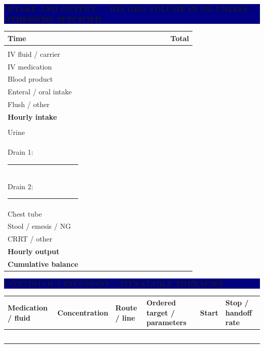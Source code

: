 \documentclass[10pt,letterpaper,landscape]{article}
\renewcommand{\arraystretch}{1.02}
\newcommand{\sectionbar}[1]{%
  \noindent\colorbox{navy}{\parbox{\dimexpr\linewidth-2\fboxsep\relax}{\color{white}\bfseries\scriptsize\MakeUppercase{#1}}}\vspace{1.5pt}}
\newcommand{\blankhours}{& & & & & & & & & & & &}
\begin{document}
\begin{minipage}[t]{0.625\linewidth}
\sectionbar{Intake and output --- record volume in mL unless otherwise specified}
{\fontsize{6.1}{6.6}\selectfont
\renewcommand{\arraystretch}{1.38}
\begin{tabularx}{\linewidth}{|>{\raggedright\arraybackslash}p{1.28in}|*{12}{Y|}|>{\centering\arraybackslash}p{0.43in}|}
\hline
{}\color{white}\bfseries Time \blankhours & \color{white}\bfseries Total\\\hline
{}\\\hline
IV fluid / carrier \blankhours & \\\hline
IV medication \blankhours & \\\hline
Blood product \blankhours & \\\hline
Enteral / oral intake \blankhours & \\\hline
Flush / other \blankhours & \\\hline
{}\textbf{Hourly intake} \blankhours & \\\hline
{}\\\hline
Urine \blankhours & \\\hline
Drain 1: \rule{0.42in}{0.3pt} \blankhours & \\\hline
Drain 2: \rule{0.42in}{0.3pt} \blankhours & \\\hline
Chest tube \blankhours & \\\hline
Stool / emesis / NG \blankhours & \\\hline
CRRT / other \blankhours & \\\hline
{}\textbf{Hourly output} \blankhours & \\\hline
{}\textbf{Cumulative balance} \blankhours & \\\hline
\end{tabularx}}
\vspace{3pt}

\sectionbar{Continuous infusions / titratable therapies}
{\fontsize{6.3}{6.8}\selectfont
\renewcommand{\arraystretch}{1.05}
\begin{tabularx}{\linewidth}{|R{1.12in}|R{0.72in}|R{0.63in}|X|R{0.52in}|R{0.62in}|}
\hline
{}\textbf{Medication / fluid} & \textbf{Concentration} & \textbf{Route / line} & \textbf{Ordered target / parameters} & \textbf{Start} & \textbf{Stop / handoff rate}\\\hline
\rule{0pt}{3.8ex} & & & & & \\\hline
\rule{0pt}{3.8ex} & & & & & \\\hline
\rule{0pt}{3.8ex} & & & & & \\\hline
\rule{0pt}{3.8ex} & & & & & \\\hline
\rule{0pt}{3.8ex} & & & & & \\\hline
\end{tabularx}}
\vspace{3pt}


\end{minipage}
\end{document}
